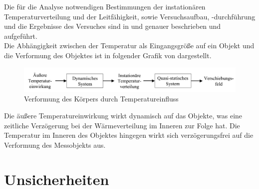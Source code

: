 Die für die Analyse notwendigen Bestimmungen der instationären Temperaturverteilung und der Leitfähigkeit, sowie Versuchsaufbau, -durchführung und die Ergebnisse des Versuches sind in \cite{Eichhorn2005} und \cite{Eichhorn2005a} genauer beschrieben und aufgeführt.\\
Die Abhängigkeit zwischen der Temperatur als Eingangsgröße auf ein Objekt und die Verformung des Objektes ist in folgender Grafik von \cite{Eichhorn2005a} dargestellt.
\begin{figure}[h]
	\label{fig:temperatureinfluss}
	\centering
		\includegraphics[scale=1.5]{bilder/temperatureinfluss}
	\caption{Verformung des Körpers durch Temperatureinfluss}
\end{figure}
Die äußere Temperatureinwirkung wirkt dynamisch auf das Objekte, was eine zeitliche Verzögerung bei der Wärmeverteilung im Inneren zur Folge hat. Die Temperatur im Inneren des Objektes hingegen wirkt sich verzögerungsfrei auf die Verformung des Messobjekts aus.

\section{Unsicherheiten}\label{sec:unsicherheiten}

